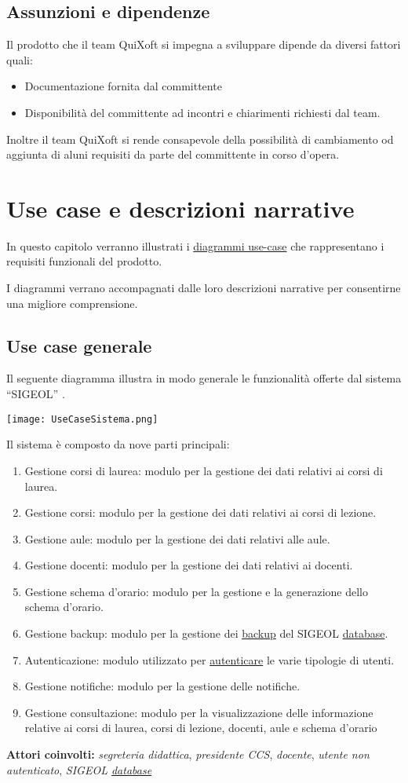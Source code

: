 \documentclass[11pt,a4paper]{article}
\begin{document}
\subsection{Assunzioni e dipendenze}
Il prodotto che il team QuiXoft si impegna a sviluppare dipende da diversi fattori quali:
\begin{itemize}
 \item Documentazione fornita dal committente
 \item Disponibilità del committente ad incontri e chiarimenti richiesti dal team.
\end{itemize}
Inoltre il team QuiXoft si rende consapevole della possibilità di cambiamento od aggiunta di aluni requisiti da parte del committente in corso d'opera.
\section{Use case e descrizioni narrative}
In questo capitolo verranno illustrati i \underline{diagrammi use-case} che rappresentano i requisiti funzionali del prodotto.

I diagrammi verrano accompagnati dalle loro descrizioni narrative per consentirne una migliore comprensione.
\subsection{Use case generale}
Il seguente diagramma illustra in modo generale le funzionalità offerte dal sistema ``SIGEOL'' .
\begin{center}
 \texttt{[image: UseCaseSistema.png]}
\end{center}

Il sistema è composto da nove parti principali:
\begin{enumerate}
\item Gestione corsi di laurea: modulo per la gestione dei dati relativi ai corsi di laurea.
\item Gestione corsi: modulo per la gestione dei dati relativi ai corsi di lezione.
\item Gestione aule: modulo per la gestione dei dati relativi alle aule.
\item Gestione docenti: modulo per la gestione dei dati relativi ai docenti.
\item Gestione schema d'orario: modulo per la gestione e la generazione dello schema d'orario.
\item Gestione backup: modulo per la gestione dei \underline{backup} del SIGEOL \underline{database}.
\item Autenticazione: modulo utilizzato per \underline{autenticare} le varie tipologie di utenti.
\item Gestione notifiche: modulo per la gestione delle notifiche.
\item Gestione consultazione: modulo per la visualizzazione delle informazione relative ai corsi di laurea, corsi di lezione, docenti, aule e schema d'orario
\end{enumerate}
\textbf{Attori coinvolti:}
\textit{segreteria didattica}, \textit{presidente CCS}, \textit{docente}, \textit{utente non autenticato}, \textit{SIGEOL \underline{database}}
\end{document}
